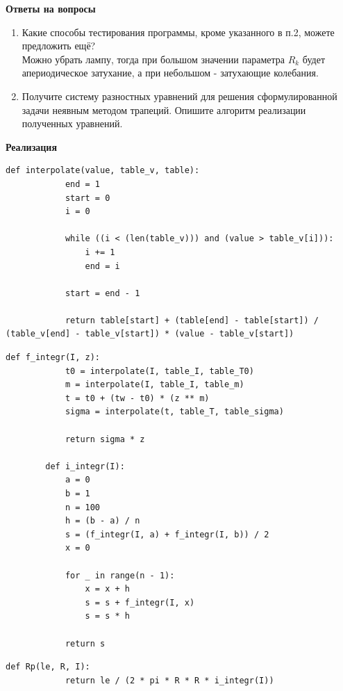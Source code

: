 \documentclass[14pt, a4paper]{extarticle}
\begin{document}
	\textbf{Ответы на вопросы}
	\begin{enumerate}
		\item Какие способы тестирования программы, кроме указанного в п.2, можете предложить ещё?\\
		Можно убрать лампу, тогда при большом значении параметра $R_k$ будет апериодическое затухание, а при небольшом - затухающие колебания.
		\item Получите систему разностных уравнений для решения сформулированной задачи неявным методом трапеций. Опишите алгоритм реализации полученных уравнений.
		
	\end{enumerate}
	
	\newpage
	\textbf{Реализация}
	
	\begin{lstlisting}[caption=Интерполяция]
		def interpolate(value, table_v, table):
			end = 1
			start = 0
			i = 0
			
			while ((i < (len(table_v))) and (value > table_v[i])):
				i += 1
				end = i
			
			start = end - 1
			
			return table[start] + (table[end] - table[start]) / (table_v[end] - table_v[start]) * (value - table_v[start])
	\end{lstlisting}

	\begin{lstlisting}[caption=Интегрирование]
		def f_integr(I, z):
			t0 = interpolate(I, table_I, table_T0)
			m = interpolate(I, table_I, table_m)
			t = t0 + (tw - t0) * (z ** m)
			sigma = interpolate(t, table_T, table_sigma)
			
			return sigma * z
		
		def i_integr(I):
			a = 0
			b = 1
			n = 100
			h = (b - a) / n
			s = (f_integr(I, a) + f_integr(I, b)) / 2
			x = 0
			
			for _ in range(n - 1):
				x = x + h
				s = s + f_integr(I, x)
				s = s * h
			
			return s
	\end{lstlisting}

	\begin{lstlisting}[caption=Вычисление сопротивления Rp]
		def Rp(le, R, I):
			return le / (2 * pi * R * R * i_integr(I))
	\end{lstlisting}
\end{document}

